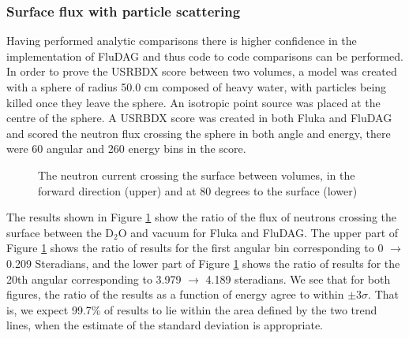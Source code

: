 \documentclass{anstrans}
\begin{document}
\subsubsection*{Surface flux with particle scattering}
Having performed analytic comparisons there is higher confidence in
the implementation of FluDAG and thus code to code comparisons can be
performed. In order to prove the USRBDX score between two volumes, a
model was created with a sphere of radius 50.0 cm composed of heavy
water, with particles being killed once they leave the sphere. An
isotropic point source was placed at the centre of the sphere. A
USRBDX score was created in both Fluka and FluDAG and scored the
neutron flux crossing the sphere in both angle and energy, there were
60 angular and 260 energy bins in the score.
\begin{figure}[h!]
	\begin{center}
		\caption{The neutron current crossing the surface between volumes, in the 
		forward direction (upper) and at 80 degrees to the surface (lower)}
	\end{center}
\label{mat_usrbdx}
\end{figure}
The results shown in Figure \ref{mat_usrbdx} show the ratio of the
flux of neutrons crossing the surface between the D$_2$O and vacuum
for Fluka and FluDAG. The upper part of Figure \ref{mat_usrbdx} shows
the ratio of results for the first angular bin corresponding to 0
$\to$ 0.209 Steradians, and the lower part of Figure \ref{mat_usrbdx}
shows the ratio of results for the 20th angular corresponding to 3.979
$\to$ 4.189 steradians. We see that for both figures, the ratio of the
results as a function of energy agree to within $\pm 3\sigma$. That is, we
expect 99.7\% of results to lie within the area defined by the two
trend lines, when the estimate of the standard deviation is appropriate.
\end{document}
